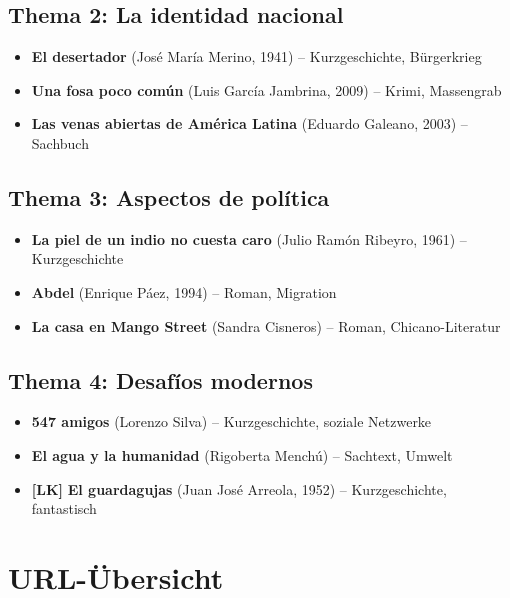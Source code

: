 \documentclass[11pt,a4paper]{article}
\newcommand{\lmark}{\textcolor{accentorange}{\textbf{[LK]}}}
\begin{document}
\subsection{Thema 2: La identidad nacional}
\begin{itemize}[leftmargin=0.5cm, itemsep=2pt]
\item \textbf{El desertador} (José María Merino, 1941) -- Kurzgeschichte, Bürgerkrieg
\item \textbf{Una fosa poco común} (Luis García Jambrina, 2009) -- Krimi, Massengrab
\item \textbf{Las venas abiertas de América Latina} (Eduardo Galeano, 2003) -- Sachbuch
\end{itemize}

\subsection{Thema 3: Aspectos de política}
\begin{itemize}[leftmargin=0.5cm, itemsep=2pt]
\item \textbf{La piel de un indio no cuesta caro} (Julio Ramón Ribeyro, 1961) -- Kurzgeschichte
\item \textbf{Abdel} (Enrique Páez, 1994) -- Roman, Migration
\item \textbf{La casa en Mango Street} (Sandra Cisneros) -- Roman, Chicano-Literatur
\end{itemize}

\subsection{Thema 4: Desafíos modernos}
\begin{itemize}[leftmargin=0.5cm, itemsep=2pt]
\item \textbf{547 amigos} (Lorenzo Silva) -- Kurzgeschichte, soziale Netzwerke
\item \textbf{El agua y la humanidad} (Rigoberta Menchú) -- Sachtext, Umwelt
\item \lmark{} \textbf{El guardagujas} (Juan José Arreola, 1952) -- Kurzgeschichte, fantastisch
\end{itemize}

\section{URL-Übersicht}
\end{document}
